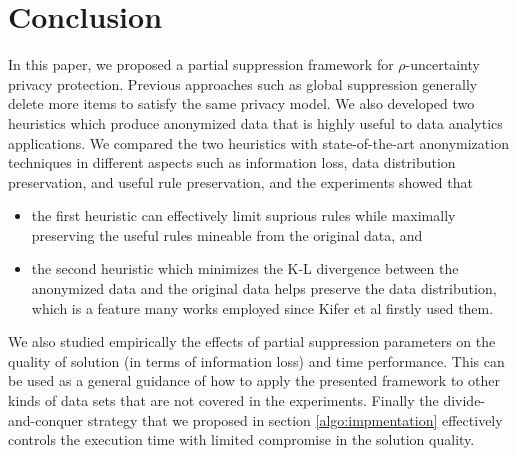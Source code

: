 \section{Conclusion}
\label{sec:conclude}
In this paper, we proposed a partial suppression framework for
$\rho$-uncertainty privacy protection.  Previous approaches such as
global suppression generally delete more items to satisfy the same
privacy model.  We also developed two heuristics which produce anonymized
data that is highly useful to data analytics applications.
We compared the two heuristics with state-of-the-art anonymization techniques
in different aspects such as information loss, data distribution preservation,
and useful rule preservation, and the experiments showed that
\begin{itemize}
\item the first heuristic can effectively limit suprious rules while
maximally preserving the useful rules mineable from the original data, and
\item the second heuristic which minimizes the K-L divergence between the
anonymized data and the original data helps preserve the data distribution,
which is a feature many works employed since Kifer et al \cite{Kifer:l-diversity} firstly used them.
\end{itemize}
We also studied empirically the effects of partial suppression parameters
on the quality of solution (in terms of information loss) and time performance.
This can be used as a general guidance of how to apply the presented framework
to other kinds of data sets that are not covered in the experiments.
Finally the divide-and-conquer strategy that we proposed in section \ref{algo:impmentation}
effectively controls the execution time with limited compromise in the solution quality.
